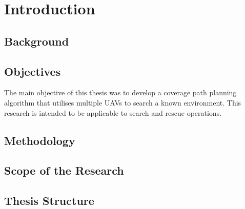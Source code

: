 \chapter{Introduction}
\label{chp:intro}


\section{Background}



\section{Objectives}

The main objective of this thesis was to develop a coverage path planning algorithm that utilises multiple UAVs to search a known environment. This research is intended to be applicable to search and rescue operations.\linebreak


\section{Methodology}

\section{Scope of the Research}

\section{Thesis Structure}
